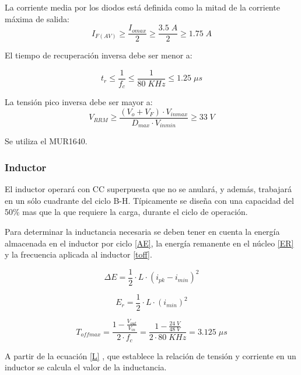 \documentclass[11pt, a4paper]{article}
\begin{document}
La corriente media por los diodos está definida como la mitad de la corriente máxima de salida:
\begin{equation}
I_{F(AV)} \geq \frac{I_{omax}}{2} \geq \frac{3.5 \; A}{2} \geq 1.75 \; A
\end{equation}

El tiempo de recuperación inversa debe ser menor a:

\begin{equation}
t_r \leq \frac{1}{f_c} \leq \frac{1}{80 \; KHz} \leq 1.25 \; \mu s
\end{equation}

La tensión pico inversa debe ser mayor a:
\begin{equation}
V_{RRM} \geq \frac{(V_o + V_F) \cdot V_{inmax} }{D_{max} \cdot V_{inmin}} \geq 33 \; V
\label{VRDO}
\end{equation}

Se utiliza el MUR1640.

\subsubsection{Inductor}
El inductor operará con CC superpuesta que no se anulará, y además, trabajará en un sólo cuadrante del ciclo B-H. Típicamente se diseña con una capacidad del 50\% mas que la que requiere la carga, durante el ciclo de operación.

Para determinar la inductancia necesaria se deben tener en cuenta la energía almacenada en el inductor por ciclo \ref{AE}, la energía remanente en el núcleo \ref{ER} y la frecuencia aplicada al inductor \ref{toff}.

\begin{equation}
\Delta E = \frac{1}{2} \cdot L \cdot (i_{pk} - i_{min})^2 
\label{AE}
\end{equation}

\begin{equation}
E_r = \frac{1}{2} \cdot L \cdot (i_{min})^2 
\label{ER}
\end{equation}

\begin{equation}
T_{offmax} = \frac{1 - \frac{V_{out}}{V_{in}}}{2\cdot f_c} = \frac{1 - \frac{24 \; V}{48 \; V}}{2\cdot 80 \; KHz} = 3.125 \; \mu s
\label{toff}
\end{equation}

A partir de la ecuación \ref{L} , que establece la relación de tensión y corriente en un inductor se calcula el valor de la inductancia.
\end{document}
